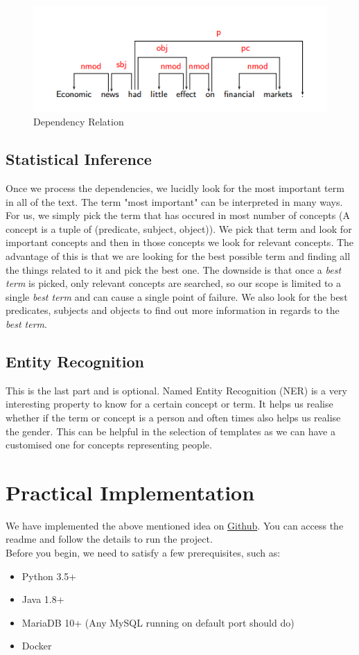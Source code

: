 \documentclass[conference]{IEEEtran}
\begin{document}
\begin{figure}[h!]
\centering
\includegraphics[scale=0.4]{image1}
\caption{Dependency Relation}
    \label{fig:image1}
\end{figure}

\subsection{Statistical Inference}
Once we process the dependencies, we lucidly look for the most important term in all of the text. The term "most important" can be interpreted in many ways. For us, we simply pick the term that has occured in most number of concepts (A concept is a tuple of (predicate, subject, object)). We pick that term and look for important concepts and then in those concepts we look for relevant concepts. The advantage of this is that we are looking for the best possible term and finding all the things related to it and pick the best one. The downside is that once a \textit{best term} is picked, only relevant concepts are searched, so our scope is limited to a single \textit{best term} and can cause a single point of failure. We also look for the best predicates, subjects and objects to find out more information in regards to the \textit{best term}.

\subsection{Entity Recognition}
This is the last part and is optional. Named Entity Recognition (NER) is a very interesting property to know for a certain concept or term. It helps us realise whether if the term or concept is a person and often times also helps us realise the gender. This can be helpful in the selection of templates as we can have a customised one for concepts representing people.

\section{Practical Implementation}
We have implemented the above mentioned idea on \href{https://github.com/vivekpatani/text-summarizer}{Github}. You can access the readme and follow the details to run the project.\\
Before you begin, we need to satisfy a few prerequisites, such as:
\begin{itemize}
\item Python 3.5+
\item Java 1.8+
\item MariaDB 10+ (Any MySQL running on default port should do)
\item Docker
\end{itemize}
\end{document}
